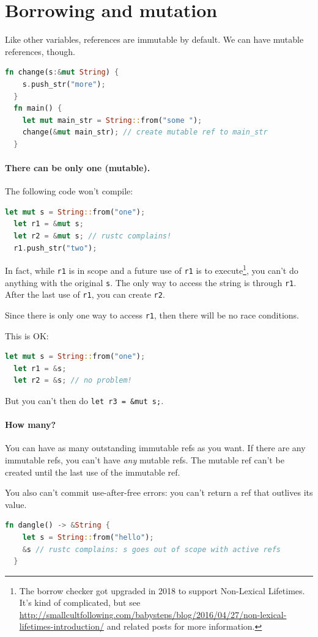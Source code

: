 \documentclass[a4paper]{report}
\begin{document}
\section*{Borrowing and mutation} Like other variables, references are immutable by default.
We can have mutable references, though.
\begin{lstlisting}[language=Rust]
  fn change(s:&mut String) {
    s.push_str("more");
  }
  fn main() {
    let mut main_str = String::from("some ");
    change(&mut main_str); // create mutable ref to main_str
  }
\end{lstlisting}

\paragraph{There can be only one (mutable).} The following code won't compile:
\begin{lstlisting}[language=Rust]
  let mut s = String::from("one");
  let r1 = &mut s;
  let r2 = &mut s; // rustc complains!
  r1.push_str("two");
\end{lstlisting}
In fact, while {\tt r1} is in scope and a future use of {\tt r1} is to execute\footnote{The borrow checker got upgraded in 2018 to support Non-Lexical Lifetimes. It's kind of complicated, but see \url{http://smallcultfollowing.com/babysteps/blog/2016/04/27/non-lexical-lifetimes-introduction/} and related posts for more information.},
you can't do anything with the original {\tt s}.
The only way to access the string is through {\tt r1}.
After the last use of {\tt r1},
you can create {\tt r2}.

Since there is only one way to access {\tt r1}, then there will be no race conditions.

This is OK:
\begin{lstlisting}[language=Rust]
  let mut s = String::from("one");
  let r1 = &s;
  let r2 = &s; // no problem!
\end{lstlisting}
But you can't then do {\tt let r3 = \&mut s;}.

\paragraph{How many?} You can have as many outstanding immutable refs as you want.
If there are any immutable refs, you can't have \emph{any} mutable refs. The mutable
ref can't be created until the last use of the immutable ref.

You also can't commit use-after-free errors: you can't return a ref that outlives
its value.
\begin{lstlisting}[language=Rust]
  fn dangle() -> &String {
    let s = String::from("hello");
    &s // rustc complains: s goes out of scope with active refs
  }
\end{lstlisting}
\end{document}
